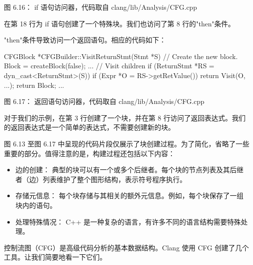 \begin{center}
图 6.16： if 语句访问器，代码取自 clang/lib/Analysis/CFG.cpp
\end{center}

在第 18 行为 if 语句创建了一个特殊块。我们也访问了第 8 行的"then"条件。

"then"条件导致访问一个返回语句。相应的代码如下：

\begin{cpp}
CFGBlock *CFGBuilder::VisitReturnStmt(Stmt *S) {
  // Create the new block.
  Block = createBlock(false);
  ...
  // Visit children
  if (ReturnStmt *RS = dyn_cast<ReturnStmt>(S)) {
    if (Expr *O = RS->getRetValue())
      return Visit(O, ...);
    return Block;
  }
  ...
}
\end{cpp}

\begin{center}
图 6.17： 返回语句访问器，代码取自 clang/lib/Analysis/CFG.cpp
\end{center}

对于我们的示例，在第 3 行创建了一个块，并在第 8 行访问了返回表达式。我们的返回表达式是一个简单的表达式，不需要创建新的块。

图 6.13 至图 6.17 中呈现的代码片段仅展示了块创建过程。为了简化，省略了一些重要的部分。值得注意的是，构建过程还包括以下内容：

\begin{itemize}
\item
边的创建： 典型的块可以有一个或多个后继者。每个块的节点列表及其后继者（边）列表维护了整个图形结构，表示符号程序执行。

\item
存储元信息： 每个块存储与其相关的额外元信息。例如，每个块保存了一组块内的语句。

\item
处理特殊情况： C++ 是一种复杂的语言，有许多不同的语言结构需要特殊处理。
\end{itemize}

控制流图（CFG）是高级代码分析的基本数据结构。Clang 使用 CFG 创建了几个工具。让我们简要地看一下它们。

















